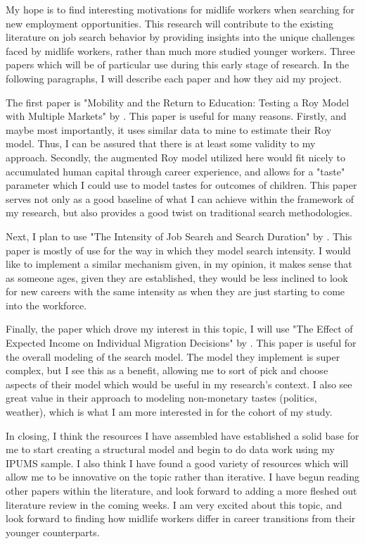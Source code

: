 \documentclass[11pt,a4paper]{article}
\begin{document}
My hope is to find interesting motivations for midlife workers when searching for new employment opportunities. This research will contribute to the existing literature on job search behavior by providing insights into the unique challenges faced by midlife workers, rather than much more studied younger workers.
Three papers which will be of particular use during this early stage of research. In the following paragraphs, I will describe each paper and how they aid my project.

The first paper is "Mobility and the Return to Education: Testing a Roy Model with Multiple Markets" by \cite{dahl_mobility_2002}. This paper is useful for many reasons. Firstly, and maybe most importantly, it uses similar data to mine to estimate their Roy model. Thus, I can be assured that there is at 
least some validity to my approach. Secondly, the augmented Roy model utilized here would fit nicely to accumulated human capital through  career experience, and allows for a "taste" parameter which I could use to model tastes for outcomes of children. This paper serves not only as a good baseline of what I 
can achieve within the framework of my research, but also provides a good twist on traditional search methodologies.

Next, I plan to use "The Intensity of Job Search and Search Duration" by \cite{faberman_intensity_2019}. This paper is mostly of use for the way in which they model search intensity. I would like to implement a similar mechanism given, in my opinion, it makes sense that as someone ages, given they are established,
they would be less inclined to look for new careers with the same intensity as when they are just starting to come into the workforce.

Finally, the paper which drove my interest in this topic, I will use "The Effect of Expected Income on Individual Migration Decisions" by \cite{kennan_effect_2011}. This paper is useful for the overall modeling of the search model. The model they implement is super complex, but I see this as a benefit,
allowing me to sort of pick and choose aspects of their model which would be useful in my research's context. I also see great value in their approach to modeling non-monetary tastes (politics, weather), which is what I am more interested in for the cohort of my study. 

In closing, I think the resources I have assembled have established a solid base for me to start creating a structural model and begin to do data work using my IPUMS sample. I also think I have found a good variety of resources which will allow me to be innovative on the topic rather than iterative. I have begun reading other papers within the literature,
and look forward to adding a more fleshed out literature review in the coming weeks. I am very excited about this topic, and look forward to finding how midlife workers differ in career transitions from their younger counterparts. 


\printbibliography
\end{document}
